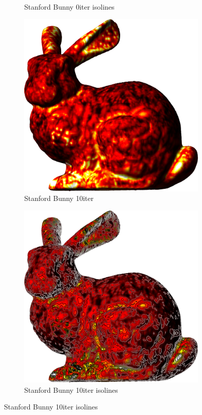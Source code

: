 \begin{figure}[ht]
{\begin{subfigure}[b]{0.48\linewidth}
		\caption{Stanford Bunny 0iter isolines}\label{fig:bun.b}
	\end{subfigure}

	\bigskip
	\begin{subfigure}[b]{0.48\linewidth}
		\includegraphics[width=1.0\linewidth,height=0.3\textheight,keepaspectratio]{data/acquired_meshes/bun_zipper_edited_r1_n4_v256_funcvals_10iter.png}
		\caption{Stanford Bunny 10iter}\label{fig:bun.c}
	\end{subfigure}
	\begin{subfigure}[b]{0.48\linewidth}
		\includegraphics[width=1.0\linewidth,height=0.3\textheight,keepaspectratio]{data/acquired_meshes/bun_zipper_edited_r1_n4_v256_funcvals_isolines_10iter.png}
		\caption{Stanford Bunny 10iter isolines}\label{fig:bun.d}
	\end{subfigure}

}
\end{figure}
